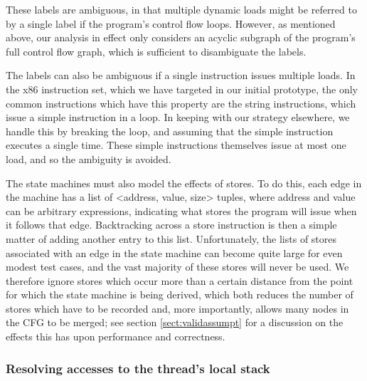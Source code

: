 \documentclass[10pt,twocolumn,preprint,natbib,authoryear]{sigplanconf}
\begin{document}
These labels are ambiguous, in that multiple dynamic loads might be
referred to by a single label if the program's control flow loops.
However, as mentioned above, our analysis in effect only considers an
acyclic subgraph of the program's full control flow graph, which is
sufficient to disambiguate the labels.

The labels can also be ambiguous if a single instruction issues
multiple loads.  In the x86 instruction set, which we have targeted in
our initial prototype, the only common instructions which have this
property are the string instructions, which issue a simple instruction
in a loop.  In keeping with our strategy elsewhere, we handle this by
breaking the loop, and assuming that the simple instruction executes a
single time.  These simple instructions themselves issue at most one
load, and so the ambiguity is avoided.

The state machines must also model the effects of stores.  To do this,
each edge in the machine has a list of <address, value, size> tuples,
where address and value can be arbitrary expressions, indicating what
stores the program will issue when it follows that edge.  Backtracking
across a store instruction is then a simple matter of adding another
entry to this list.  Unfortunately, the lists of stores associated
with an edge in the state machine can become quite large for even
modest test cases, and the vast majority of these stores will never be
used.  We therefore ignore stores which occur more than a certain
distance from the point for which the state machine is being derived,
which both reduces the number of stores which have to be recorded and,
more importantly, allows many nodes in the CFG to be merged; see
section \ref{sect:validassumpt} for a discussion on the effects this
has upon performance and correctness.

\subsubsection{Resolving accesses to the thread's local stack}
\label{sect:resolvestack}
\end{document}
